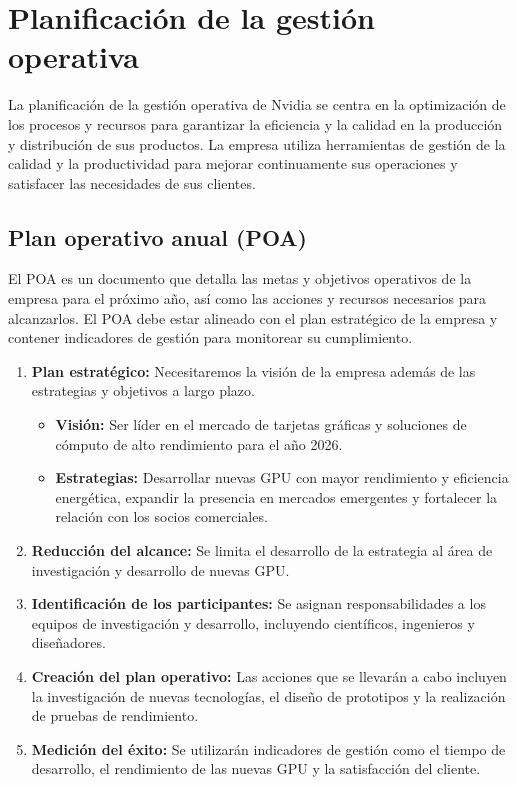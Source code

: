 \documentclass{article}
\begin{document}
\section{Planificación de la gestión operativa}

La planificación de la gestión operativa de Nvidia se centra en la optimización de los procesos y recursos para garantizar la eficiencia y la calidad en la producción y distribución de sus productos. La empresa utiliza herramientas de gestión de la calidad y la productividad para mejorar continuamente sus operaciones y satisfacer las necesidades de sus clientes.

\subsection{Plan operativo anual (POA)}

El POA es un documento que detalla las metas y objetivos operativos de la empresa para el próximo año, así como las acciones y recursos necesarios para alcanzarlos. El POA debe estar alineado con el plan estratégico de la empresa y contener indicadores de gestión para monitorear su cumplimiento.

\begin{enumerate}
  \item \textbf{Plan estratégico:} Necesitaremos la visión de la empresa además de las estrategias y objetivos a largo plazo.
  \begin{itemize}
    \item \textbf{Visión:} Ser líder en el mercado de tarjetas gráficas y soluciones de cómputo de alto rendimiento para el año 2026.
    \item \textbf{Estrategias:} Desarrollar nuevas GPU con mayor rendimiento y eficiencia energética, expandir la presencia en mercados emergentes y fortalecer la relación con los socios comerciales.
  \end{itemize}
  
  \item \textbf{Reducción del alcance:} Se limita el desarrollo de la estrategia al área de investigación y desarrollo de nuevas GPU.
  
  \item \textbf{Identificación de los participantes:} Se asignan responsabilidades a los equipos de investigación y desarrollo, incluyendo científicos, ingenieros y diseñadores.
  
  \item \textbf{Creación del plan operativo:} Las acciones que se llevarán a cabo incluyen la investigación de nuevas tecnologías, el diseño de prototipos y la realización de pruebas de rendimiento.
  
  \item \textbf{Medición del éxito:} Se utilizarán indicadores de gestión como el tiempo de desarrollo, el rendimiento de las nuevas GPU y la satisfacción del cliente.
\end{enumerate}
\end{document}
